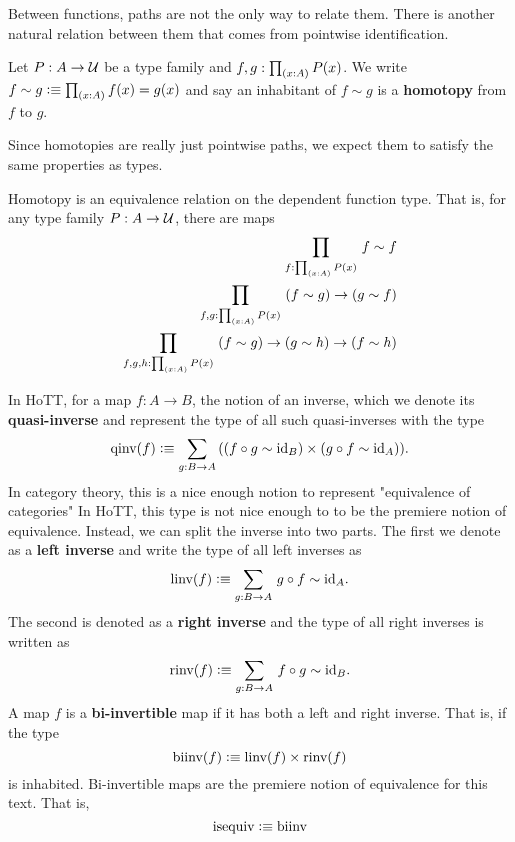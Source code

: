 \documentclass[main.tex]{subfiles}
\begin{document}
Between functions, paths are not the only way to relate them. There is another natural relation between them that comes from
pointwise identification.
\begin{definition}
    Let $P : A \to \mathcal{U}$ be a type family and $f,g : \prd{x : A}P(x)$. We write
    $f\sim g \defeq \prd{x : A} f(x) = g(x) $
    and say an inhabitant of $f \sim g$ is a \textbf{homotopy} from $f$ to $g$.
\end{definition}
Since homotopies are really just pointwise paths, we expect them to satisfy the same properties as types. 
\begin{lemma}
    Homotopy is an equivalence relation on the dependent function type. That is, for any type family $P : A \to \mathcal{U}$, there are maps
    \begin{align*}
        \prd{f : \prd{x : A}P(x)} f \sim f\\
        \prd{f,g : \prd{x:A}P(x)} \left ( f \sim g \right ) \to \left ( g \sim f \right )\\
        \prd{f,g,h : \prd{x : A} P(x)} \left ( f \sim g \right ) \to \left ( g \sim h \right ) \to \left (f \sim h\right )
    \end{align*}
\end{lemma}
In HoTT, for a map $f : A \to B$, the notion of an inverse, which we denote its \textbf{quasi-inverse} and represent the type of all such
quasi-inverses with the type
\begin{equation}
    \qinv(f) \defeq \sm{g : B \to A}((f\circ g \sim \id{B})\times(g \circ f \sim \id{A})).
\end{equation} 
In category theory, this is a nice enough notion to represent "equivalence of categories" In HoTT, this type is not nice enough to 
to be the premiere notion of equivalence. Instead, we can split the inverse into two parts. The first we denote
as a \textbf{left inverse} and write the type of all left inverses as 
\begin{equation}
    \linv(f) \defeq \sm{g : B \to A}g \circ f \sim \id{A}.
\end{equation}
The second is denoted as a \textbf{right inverse} and the type of all right inverses is written as
\begin{equation}
    \rinv(f) \defeq \sm{g : B \to A} f \circ g \sim \id{B}.
\end{equation}
A map $f$ is a \textbf{bi-invertible} map if it has both a left and right inverse. That is, if the type
\begin{equation}
\normalfont \text{biinv}(f) \vcentcolon\equiv \normalfont \text{linv}(f) \times \normalfont \text{rinv}(f)
\end{equation}
is inhabited. Bi-invertible maps are the premiere notion of equivalence for this text. That is,
\begin{equation}
    \normalfont \text{isequiv} \vcentcolon\equiv \normalfont \text{biinv}
\end{equation}
\end{document}
